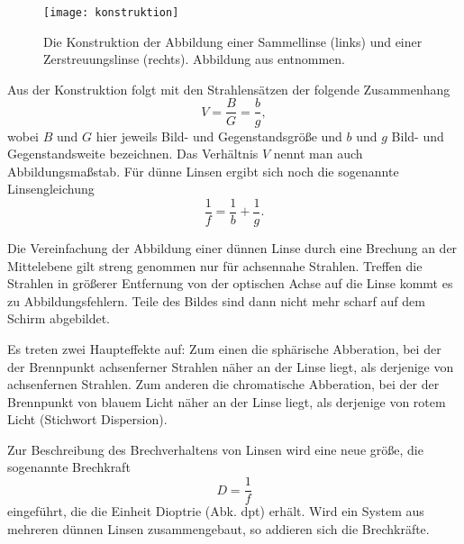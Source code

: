 \begin{figure}
  \centering
  \texttt{[image: konstruktion]}
  \caption{Die Konstruktion der Abbildung einer Sammellinse (links) und
    einer Zerstreuungslinse (rechts). Abbildung aus \textcite{v408}
    entnommen.}
  \label{fig:konstruktion}
\end{figure}

Aus der Konstruktion folgt mit den Strahlensätzen der folgende
Zusammenhang
%
\begin{equation}
  \label{eq:abbildungsmassstab}
  V = \frac{B}{G} = \frac{b}{g},
\end{equation}
%
wobei $B$ und $G$ hier jeweils Bild- und Gegenstandsgröße und $b$ und
$g$ Bild- und Gegenstandsweite bezeichnen.  Das Verhältnis $V$ nennt man
auch Abbildungsmaßstab.  Für dünne Linsen ergibt sich noch die
sogenannte Linsengleichung
%
\begin{equation}
  \label{eq:linsengleichung}
  \frac{1}{f} = \frac{1}{b} + \frac{1}{g}.
\end{equation}

Die Vereinfachung der Abbildung einer dünnen Linse durch eine Brechung
an der Mittelebene gilt streng genommen nur für achsennahe Strahlen.
Treffen die Strahlen in größerer Entfernung von der optischen Achse auf
die Linse kommt es zu Abbildungsfehlern.  Teile des Bildes sind dann
nicht mehr scharf auf dem Schirm abgebildet.

Es treten zwei Haupteffekte auf: Zum einen die sphärische Abberation,
bei der der Brennpunkt achsenferner Strahlen näher an der Linse liegt,
als derjenige von achsenfernen Strahlen. Zum anderen die chromatische
Abberation, bei der der Brennpunkt von blauem Licht näher an der Linse
liegt, als derjenige von rotem Licht (Stichwort Dispersion).

Zur Beschreibung des Brechverhaltens von Linsen wird eine neue
größe, die sogenannte Brechkraft 
%
\begin{equation}
  \label{eq:brechkraft}
  D = \frac{1}{f}
\end{equation}
%
eingeführt, die die Einheit Dioptrie (Abk. dpt) erhält. Wird ein System
aus mehreren dünnen Linsen zusammengebaut, so addieren sich die
Brechkräfte.

